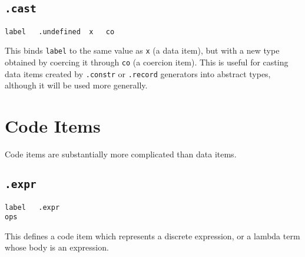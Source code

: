 \documentclass{report}
\newcommand\stringcode[1]{\texttt{#1}}
\begin{document}
\section{\stringcode{.cast}}

\begin{verbatim}
label	.undefined	x	co
\end{verbatim}

This binds \stringcode{label} to the same value as \stringcode{x} (a data item),
but with a new type obtained by coercing it through \stringcode{co} (a coercion item).
This is useful for casting data items created by \stringcode{.constr} or \stringcode{.record} generators into abstract types,
although it will be used more generally.

\chapter{Code Items}

Code items are substantially more complicated than data items.

\section{\stringcode{.expr}}

\begin{verbatim}
label	.expr
ops
\end{verbatim}

This defines a code item which represents a discrete expression, or a lambda term whose body is an expression.
\end{document}
